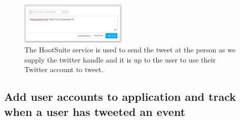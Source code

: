 \documentclass[letterpaper,10pt,onecolumn]{IEEEtran} %
\begin{document}
\begin{figure}[htp]
  \begin{center}
  
  \includegraphics[width=2in]{tweet_person2}
  \centering
  \caption{The HootSuite service is used to send the tweet at the person as we supply the twitter handle and it is up to the user to use their Twitter account to tweet.}

  \end{center}
\end{figure}

\subsection{Add user accounts to application and track when a user has tweeted an event}
\end{document}
